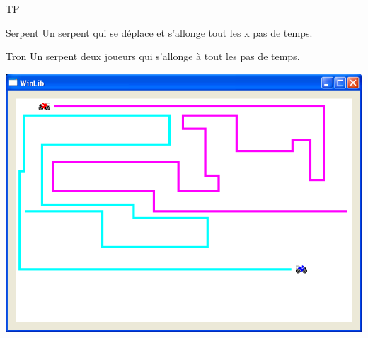 \begin{frame}{TP}

    \begin{minipage}{0.47\linewidth}
        \begin{block}{Serpent}
            Un serpent qui se déplace et s'allonge tout les x pas de temps.
        \end{block}
            \begin{block}{Tron}
                Un serpent deux joueurs qui s'allonge à tout les pas de temps.
            \end{block}

    \end{minipage}
    \hfill
    \begin{minipage}{0.47\linewidth}
        \includegraphics[width=\linewidth]{images/tp.png}
    \end{minipage}
\end{frame}





